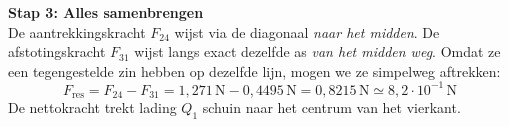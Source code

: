 \documentclass{ximera}
\begin{document}
\begin{exercise}
\begin{question}
\begin{solution}
            \textbf{Stap 3: Alles samenbrengen}\\
            De aantrekkingskracht $F_{24}$ wijst via de diagonaal \emph{naar het midden}.
            De afstotingskracht $F_{31}$ wijst langs exact dezelfde as \emph{van het midden weg}.
            Omdat ze een tegengestelde zin hebben op dezelfde lijn, mogen we ze simpelweg aftrekken:
            \[
                F_{\text{res}} = F_{24} - F_{31} = 1{,}271 \, \mathrm{N} - 0{,}4495 \, \mathrm{N} = 0{,}8215 \, \mathrm{N} \simeq \boxed{8{,}2 \cdot 10^{-1} \, \mathrm{N}}
            \]
            De nettokracht trekt lading $Q_1$ schuin naar het centrum van het vierkant.
        \end{solution}
    \end{question}
\end{exercise}
\end{document}
